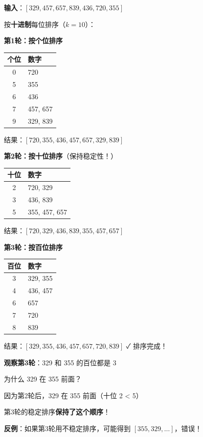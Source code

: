 \documentclass[12pt, a4paper]{ctexart}
\begin{document}
\begin{blackboard}[基数排序手算例子]

\textbf{输入}：$[329, 457, 657, 839, 436, 720, 355]$

按\textbf{十进制}每位排序（$k = 10$）：

\textbf{第1轮：按个位排序}
\begin{center}
\begin{tabular}{c|l}
个位 & 数字 \\
\hline
0 & 720 \\
5 & 355 \\
6 & 436 \\
7 & 457, 657 \\
9 & 329, 839 \\
\end{tabular}
\end{center}
结果：$[720, 355, 436, 457, 657, 329, 839]$

\textbf{第2轮：按十位排序}（保持稳定性！）
\begin{center}
\begin{tabular}{c|l}
十位 & 数字 \\
\hline
2 & 720, 329 \\
3 & 436, 839 \\
5 & 355, 457, 657 \\
\end{tabular}
\end{center}
结果：$[720, 329, 436, 839, 355, 457, 657]$

\textbf{第3轮：按百位排序}
\begin{center}
\begin{tabular}{c|l}
百位 & 数字 \\
\hline
3 & 329, 355 \\
4 & 436, 457 \\
6 & 657 \\
7 & 720 \\
8 & 839 \\
\end{tabular}
\end{center}
结果：$[329, 355, 436, 457, 657, 720, 839]$ ✓ 排序完成！

\end{blackboard}

\begin{blackboard}[稳定性的关键作用]

\textbf{观察第3轮}：329 和 355 的百位都是 3

为什么 329 在 355 前面？

因为第2轮后，329 在 355 前面（十位 2 < 5）

第3轮的稳定排序\textbf{保持了这个顺序}！

\textbf{反例}：如果第3轮用不稳定排序，可能得到 $[355, 329, \ldots]$，错误！

\end{blackboard}
\end{document}
